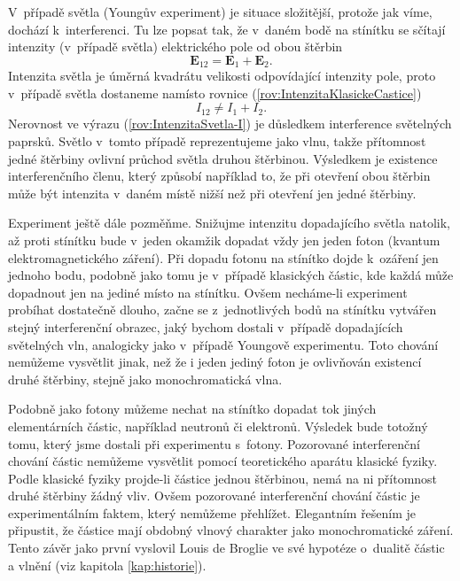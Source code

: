 V~případě světla (Youngův experiment) je situace složitější, protože jak víme, dochází k~interferenci. Tu lze popsat tak, že v~daném bodě na stínítku  se sčítají intenzity (v~případě světla) elektrického pole od obou štěrbin
\begin{equation}
\mathbf{E}_{12} = \mathbf{E}_1 + \mathbf{E}_2 \mbox{.}
\label{rov:IntenzitaSvetla-E}
\end{equation}
Intenzita světla je úměrná kvadrátu velikosti odpovídající intenzity pole, proto v~případě světla dostaneme namísto rovnice (\ref{rov:IntenzitaKlasickeCastice})
\begin{equation}
I_{12} \not = I_1 + I_2 \mbox{.}
\label{rov:IntenzitaSvetla-I}
\end{equation}
Nerovnost ve výrazu (\ref{rov:IntenzitaSvetla-I}) je důsledkem interference světelných paprsků. Světlo v~tomto případě reprezentujeme jako vlnu, takže přítomnost jedné štěrbiny ovlivní průchod světla druhou štěrbinou. Výsledkem je existence interferenčního členu, který způsobí například to, že při otevření obou štěrbin může být intenzita v~daném místě nižší než při otevření jen jedné štěrbiny.

Experiment ještě dále pozměňme. Snižujme intenzitu dopadajícího světla natolik, až proti stínítku bude v~jeden okamžik dopadat vždy jen jeden foton (kvantum elektromagnetického záření). Při dopadu fotonu na stínítko dojde k~ozáření jen jednoho bodu, podobně jako tomu je v~případě klasických částic, kde každá může dopadnout jen na jediné místo na stínítku. Ovšem necháme-li experiment probíhat dostatečně dlouho, začne se z~jednotlivých bodů na stínítku vytvářen stejný interferenční obrazec, jaký bychom dostali v~případě dopadajících světelných vln, analogicky jako v~případě Youngově experimentu. Toto chování nemůžeme vysvětlit jinak, než že i jeden jediný foton je ovlivňován existencí druhé štěrbiny, stejně jako monochromatická vlna.

Podobně jako fotony můžeme nechat na stínítko dopadat tok jiných elementárních částic, například neutronů či elektronů. Výsledek bude totožný tomu, který jsme dostali při experimentu s~fotony. Pozorované interferenční chování částic nemůžeme vysvětlit pomocí teoretického aparátu klasické fyziky. Podle klasické fyziky projde-li částice jednou štěrbinou, nemá na ni přítomnost druhé štěrbiny žádný vliv. Ovšem pozorované interferenční chování částic je experimentálním faktem, který nemůžeme přehlížet. Elegantním řešením je připustit, že částice mají obdobný vlnový charakter jako monochromatické záření. Tento závěr jako první vyslovil Louis de Broglie ve své hypotéze o~dualitě částic a vlnění (viz kapitola \ref{kap:historie}).

